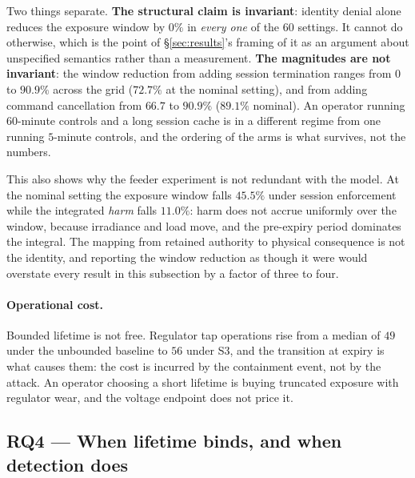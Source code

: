 Two things separate. \textbf{The structural claim is invariant}: identity denial alone reduces the
exposure window by $0\%$ in \emph{every one} of the $60$ settings. It cannot do otherwise, which is
the point of \S\ref{sec:results}'s framing of it as an argument about unspecified semantics rather
than a measurement. \textbf{The magnitudes are not invariant}: the window reduction from adding
session termination ranges from $0$ to $90.9\%$ across the grid ($72.7\%$ at the nominal setting),
and from adding command cancellation from $66.7$ to $90.9\%$ ($89.1\%$ nominal). An operator
running $60$-minute controls and a long session cache is in a different regime from one running
$5$-minute controls, and the ordering of the arms is what survives, not the numbers.

This also shows why the feeder experiment is not redundant with the model. At the nominal setting
the exposure window falls $45.5\%$ under session enforcement while the integrated \emph{harm} falls
$11.0\%$: harm does not accrue uniformly over the window, because irradiance and load move, and the
pre-expiry period dominates the integral. The mapping from retained authority to physical
consequence is not the identity, and reporting the window reduction as though it were would
overstate every result in this subsection by a factor of three to four.

\paragraph{Operational cost.} Bounded lifetime is not free. Regulator tap operations rise from a
median of $49$ under the unbounded baseline to $56$ under S3, and the transition at expiry is what
causes them: the cost is incurred by the containment event, not by the attack. An operator
choosing a short lifetime is buying truncated exposure with regulator wear, and the voltage
endpoint does not price it.

\subsection{RQ4 --- When lifetime binds, and when detection does}

